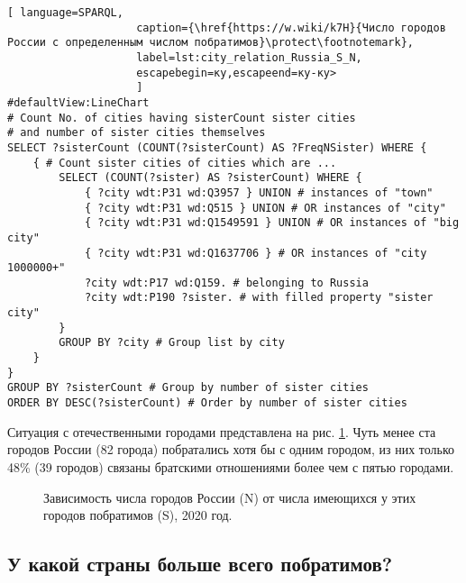 \begin{lstlisting}[ language=SPARQL, 
                    caption={\href{https://w.wiki/k7H}{Число городов России с определенным числом побратимов}\protect\footnotemark},
                    label=lst:city_relation_Russia_S_N, 
                    escapebegin=ку,escapeend=ку-ку>
                    ]
#defaultView:LineChart                                                   
# Count No. of cities having sisterCount sister cities  
# and number of sister cities themselves
SELECT ?sisterCount (COUNT(?sisterCount) AS ?FreqNSister) WHERE {                                                                                  
	{ # Count sister cities of cities which are ...
		SELECT (COUNT(?sister) AS ?sisterCount) WHERE {    
			{ ?city wdt:P31 wd:Q3957 } UNION # instances of "town"
			{ ?city wdt:P31 wd:Q515 } UNION # OR instances of "city"
			{ ?city wdt:P31 wd:Q1549591 } UNION # OR instances of "big city"
			{ ?city wdt:P31 wd:Q1637706 } # OR instances of "city 1000000+"
			?city wdt:P17 wd:Q159. # belonging to Russia
			?city wdt:P190 ?sister. # with filled property "sister city"
		}
		GROUP BY ?city # Group list by city                             
	}
}
GROUP BY ?sisterCount # Group by number of sister cities
ORDER BY DESC(?sisterCount) # Order by number of sister cities                                  
\end{lstlisting}

Ситуация с отечественными городами представлена на рис. \ref{fig:city_relation_Russia_S_N}. Чуть менее ста городов России (82 города) побратались хотя бы с одним городом, из них только 48\% (39 городов) связаны братскими отношениями более чем с пятью городами.

\begin{figure}
{
\setlength{\fboxsep}{0pt}%
\setlength{\fboxrule}{1pt}%
}
  \caption{Зависимость числа городов России (N) от числа имеющихся у этих городов побратимов (S), 2020 год.}
  \label{fig:city_relation_Russia_S_N}
\end{figure}

\subsection{У какой страны больше всего побратимов?}

